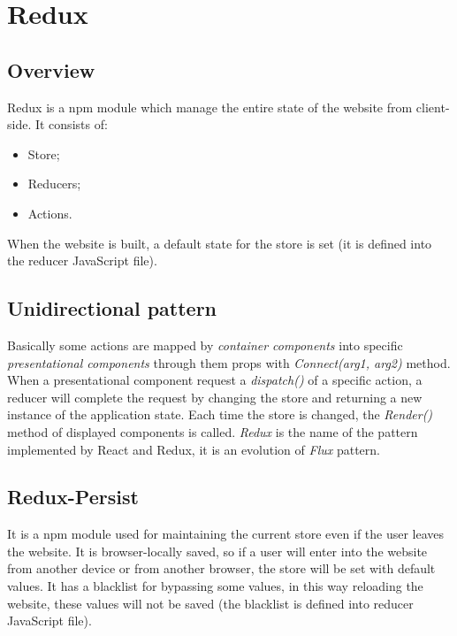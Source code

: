 \section{Redux} 
\subsection{Overview}
Redux is a npm module which manage the entire state of the website from client-side. It consists of:
\begin{itemize}
	\item Store;
	\item Reducers;
	\item Actions.
\end{itemize}
When the website is built, a default state for the store is set (it is defined into the reducer JavaScript file).
\subsection{Unidirectional pattern} 
Basically some actions are mapped by \textit{container components} into specific \textit{presentational components} through them props with \textit{Connect(arg1, arg2)} method. When a presentational component request a \textit{dispatch()} of a specific action, a reducer will complete the request by changing the store and returning a new instance of the application state. Each time the store is changed, the \textit{Render()} method of displayed components is called.
\textit{Redux} is the name of the pattern implemented by React and Redux, it is an evolution of \textit{Flux} pattern.
\subsection{Redux-Persist}
It is a npm module used for maintaining the current store even if the user leaves the website. It is browser-locally saved, so if a user will enter into the website from another device or from another browser, the store will be set with default values. It has a blacklist for bypassing some values, in this way reloading the website, these values will not be saved (the blacklist is defined into reducer JavaScript file).